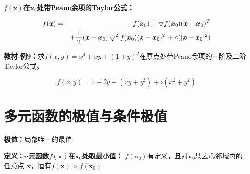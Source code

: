 {\bf $f(\bm{x})$在$\bm{x}_0$处带Peano余项的Taylor公式：}

\begin{eqnarray*}
	f(\bm{x}) & = & f(\bm{x}_0)+\bigtriangledown f(\bm{x}_0)(\bm{x}-\bm{x}_0)^T\\
	& & + \displaystyle\frac{\,{1}\,}{\,{2}\,}(\bm{x}-\bm{x}_0)\bigtriangledown^2
	f(\bm{x}_0)(\bm{x}-\bm{x}_0)^T+\circ(|\bm{x}-\bm{x}_0|^2)
\end{eqnarray*}

{\bf 教材-例9：}求$f(x,y)=x^4+xy+(1+y)^2$在原点处带Peano余项的一阶及二阶Taylor公式。

$$f(x,y)=1+2y+(xy+y^2)+\circ(x^2+y^2)$$

\section{多元函数的极值与条件极值}

{\bf 极值：}局部唯一的最值

{\bf 定义：}{\bf $n$元函数$f(\bm{x})$在$\bm{x}_0$处取最小值：}
$f(\bm{x}_0)$有定义，且对$\bm{x}_0$某去心邻域内的任意点
$\bm{x}$，恒有$f(\bm{x})>f(\bm{x}_0)$

\begin{center}
	
\end{center}

